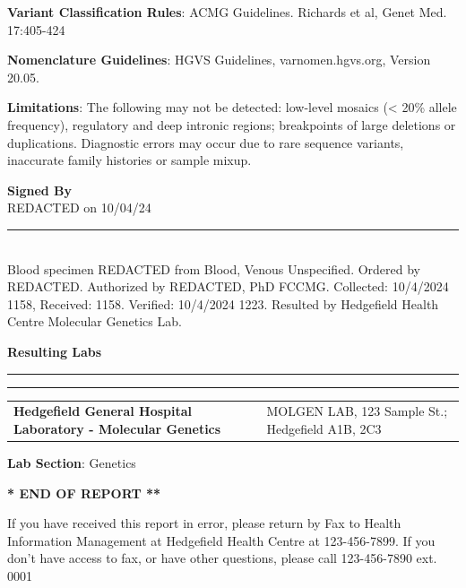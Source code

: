 \documentclass[10pt,letterpaper]{extarticle}
\newcommand{\doublerule}{\rule{\textwidth}{1pt}

\vspace{-2em}%
\rule{\textwidth}{1pt}}
\begin{document}
{\bf Variant Classification Rules}: ACMG Guidelines. Richards et al, Genet Med. 17:405-424 

{\bf Nomenclature Guidelines}: HGVS Guidelines, varnomen.hgvs.org, Version 20.05. 

{\bf Limitations}: The following may not be detected: low-level mosaics (< 20\% allele frequency), regulatory and deep intronic regions; breakpoints of large deletions or duplications. Diagnostic errors may occur due to rare sequence variants, inaccurate family histories or sample mixup.

{\bf \large Signed By}\\
REDACTED on 10/04/24

\vspace{2em}
\rule{\textwidth}{1pt}\\
{\small Blood specimen REDACTED from Blood, Venous Unspecified. Ordered by REDACTED. Authorized by REDACTED, PhD FCCMG. Collected: 10/4/2024 1158, Received: 1158. Verified: 10/4/2024 1223. Resulted by Hedgefield Health Centre Molecular Genetics Lab.}

\vspace{2em}
{\bf \large Resulting Labs}\\
\doublerule

\begin{tabular}{p{5cm} p{15cm}}
\bf \small Hedgefield General Hospital Laboratory - Molecular Genetics & \small MOLGEN LAB, 123 Sample St.; Hedgefield A1B, 2C3
\end{tabular}

{\bf Lab Section}: Genetics

\begin{center}
\bf ** END OF REPORT **
\end{center}

\begin{center}
\scriptsize
If you have received this report in error, please return by Fax to Health Information Management at Hedgefield Health Centre at 123-456-7899. If you don't have access to fax, or have other questions, please call 123-456-7890 ext. 0001
\end{center}
\end{document}
